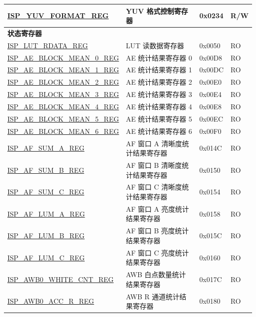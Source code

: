 \begin{longtable}{ | p{6cm} | p{7.2cm} | p{1.3cm} | p{1cm} | }
\hyperref[regdesc:ISPYUVFORMATREG]{ISP\_YUV\_FORMAT\_REG} & YUV 格式控制寄存器 & 0x0234 & R/W \\ \hline
\multicolumn{4}{|l|}{\textbf{状态寄存器}} \\ \hline
\hyperref[regdesc:ISPLUTRDATAREG]{ISP\_LUT\_RDATA\_REG} & LUT 读数据寄存器 & 0x0050 & RO \\ \hline
\hyperref[regdesc:ISPAEBLOCKMEAN0REG]{ISP\_AE\_BLOCK\_MEAN\_0\_REG} & AE 统计结果寄存器 0 & 0x00D8 & RO \\ \hline
\hyperref[regdesc:ISPAEBLOCKMEAN1REG]{ISP\_AE\_BLOCK\_MEAN\_1\_REG} & AE 统计结果寄存器 1 & 0x00DC & RO \\ \hline
\hyperref[regdesc:ISPAEBLOCKMEAN2REG]{ISP\_AE\_BLOCK\_MEAN\_2\_REG} & AE 统计结果寄存器 2 & 0x00E0 & RO \\ \hline
\hyperref[regdesc:ISPAEBLOCKMEAN3REG]{ISP\_AE\_BLOCK\_MEAN\_3\_REG} & AE 统计结果寄存器 3 & 0x00E4 & RO \\ \hline
\hyperref[regdesc:ISPAEBLOCKMEAN4REG]{ISP\_AE\_BLOCK\_MEAN\_4\_REG} & AE 统计结果寄存器 4 & 0x00E8 & RO \\ \hline
\hyperref[regdesc:ISPAEBLOCKMEAN5REG]{ISP\_AE\_BLOCK\_MEAN\_5\_REG} & AE 统计结果寄存器 5 & 0x00EC & RO \\ \hline
\hyperref[regdesc:ISPAEBLOCKMEAN6REG]{ISP\_AE\_BLOCK\_MEAN\_6\_REG} & AE 统计结果寄存器 6 & 0x00F0 & RO \\ \hline
\hyperref[regdesc:ISPAFSUMAREG]{ISP\_AF\_SUM\_A\_REG} & AF 窗口 A 清晰度统计结果寄存器 & 0x014C & RO \\ \hline
\hyperref[regdesc:ISPAFSUMBREG]{ISP\_AF\_SUM\_B\_REG} & AF 窗口 B 清晰度统计结果寄存器 & 0x0150 & RO \\ \hline
\hyperref[regdesc:ISPAFSUMCREG]{ISP\_AF\_SUM\_C\_REG} & AF 窗口 C 清晰度统计结果寄存器 & 0x0154 & RO \\ \hline
\hyperref[regdesc:ISPAFLUMAREG]{ISP\_AF\_LUM\_A\_REG} & AF 窗口 A 亮度统计结果寄存器 & 0x0158 & RO \\ \hline
\hyperref[regdesc:ISPAFLUMBREG]{ISP\_AF\_LUM\_B\_REG} & AF 窗口 B 亮度统计结果寄存器 & 0x015C & RO \\ \hline
\hyperref[regdesc:ISPAFLUMCREG]{ISP\_AF\_LUM\_C\_REG} & AF 窗口 C 亮度统计结果寄存器 & 0x0160 & RO \\ \hline
\hyperref[regdesc:ISPAWB0WHITECNTREG]{ISP\_AWB0\_WHITE\_CNT\_REG} & AWB 白点数量统计结果寄存器 & 0x017C & RO \\ \hline
\hyperref[regdesc:ISPAWB0ACCRREG]{ISP\_AWB0\_ACC\_R\_REG} & AWB R 通道统计结果寄存器 & 0x0180 & RO \\ \hline

\end{longtable}
